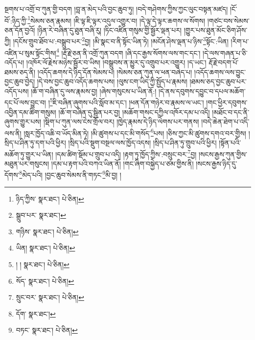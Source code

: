 སྔགས་པ་འགྲོ་བ་ཀུན་གྱི་བདག །བླ་ན་མེད་པའི་བྱང་ཆུབ་ཏུ། །བདེ་གཤེགས་ཀྱིས་ཀྱང་ལུང་བསྟན་མཛད། །ངོ་བོ་:ཉིད་ཀྱི་\footnote{ཉིད་ཀྱིས་  སྣར་ཐང་།  པེ་ཅིན། }སེམས་ཅན་རྣམས། །ཇི་ལྟ་ཇི་ལྟར་འདུལ་འགྱུར་བ། །དེ་ལྟ་དེ་ལྟར་ཆགས་ལ་སོགས། །གཙང་བས་སེམས་ཅན་དོན་བྱའོ། །ཉིན་རེ་བཞིན་དུ་ཐུན་བཞི་རུ། །ཏིང་འཛིན་གསུམ་གྱི་སྦྱོར་ལྡན་པར། །གྱུར་པས་ཐུན་མོང་ཅིག་ཤོས་ཀྱི། །དངོས་གྲུབ་ཐོབ་པ་:བསྒྲུབ་པར་\footnote{སྒྲུབ་པར་  སྣར་ཐང་། }བྱ། །མི་སྣང་བ་ནི་སྟོང་ཡིན་ཏེ། །མངོན་ཤེས་ལྡན་པ་ཉིས་\footnote{གཉིས་  སྣར་ཐང་།  པེ་ཅིན། }སྟོང་:ཡིན། །རིག་པ་འཛིན་པ་སུམ་སྟོང་གིས།\footnote{ཡིན།  སྣར་ཐང་།  པེ་ཅིན། } །རྡོ་རྗེ་ཅན་ནི་འགྲོ་ཀུན་བདག །ཞི་དང་རྒྱས་སོགས་ལས་གང་དང་། །དེ་ལས་གཞན་པ་ཅི་འདོད་པ། །འཁོར་ལོ་རྗེས་མཉེས་སྦྱོར་བ་ཡིས། །བསྒྲུབས་ན་མྱུར་དུ་འགྲུབ་པར་འགྱུར། །ད་ཡང་། རྡོ་རྗེ་བདག་པོ་ཐམས་ཅད་ནི། །འདོད་ཆགས་དེ་ཉིད་དོན་སེམས་པ། །སེམས་ཅན་ཀུན་ལ་ཕན་བཞེད་པ། །འདོད་ཆགས་ལས་བྱུང་བྱང་ཆུབ་བྱེད། །དེ་བས་བྱང་ཆུབ་འདོད་ཆགས་པས། །ལུས་ངག་ཡིད་ཀྱི་སྤྱོད་པ་རྣམས། །ཐམས་ཅད་བྱང་ཆུབ་པར་འདོད་པས། །ཆོ་ག་བཞིན་དུ་ལས་རྣམས་བྱ། །ཞེས་གསུངས་པ་ཡིན་ནོ:། །དེ་ནས་དབུགས་དབྱུང་བ་དཔལ་མཆོག་དང་པོ་ལས་བྱུང་བ། །\footnote{། །  སྣར་ཐང་།  པེ་ཅིན། }ཇི་བཞིན་ཞུགས་པའི་སློབ་མ་དང་། །ཕན་དོན་གཉེར་བ་རྣམས་ལ་ཡང་། །གང་ཕྱིར་དབུགས་འབྱིན་དམ་ཚིག་གསུམ། །ཆོ་ག་བཞིན་དུ་སྦྱིན་པར་བྱ། །མཆོག་གསང་དཀྱིལ་འཁོར་དམ་པ་འདི། །མཐོང་བ་དང་ནི་ཞུགས་གྱུར་པས། །སྡིག་པ་ཀུན་ལས་ངེས་གྲོལ་བར། །ཁྱེད་རྣམས་དེ་ཉིད་ལེགས་པར་གནས། །བདེ་ཆེན་ཐེག་པ་འདི་ལས་ནི། །སླར་ཁྱོད་འཆི་བ་ཡོད་མིན་ཏེ། །མི་ཚུགས་པ་དང་མི་གསོད་\footnote{སོད་  སྣར་ཐང་།  པེ་ཅིན། }པས། །ཅིས་ཀྱང་མི་ཚུགས་དགའ་བར་གྱིས། །སྲིད་པ་ཤིན་ཏུ་དག་པའི་ཕྱིར། །སྲིད་པའི་སྡུག་བསྔལ་ལས་ཁྱོད་འདས། །སྲིད་པ་ཤིན་ཏུ་གྲུབ་པའི་ཕྱིར། །སྟོན་པའི་མཆོག་ཏུ་གྱུར་པ་ཡིན། །དམ་ཚིག་སྡོམ་པ་གྲུབ་པ་འདི། །རྟག་ཏུ་ཁྱོད་ཀྱིས་:བསྲུང་བར་\footnote{སྲུང་བར་  སྣར་ཐང་།  པེ་ཅིན། }བྱ། །སངས་རྒྱས་ཀུན་གྱིས་མཐུན་པར་གསུངས། །དམ་པ་རྟག་པའི་བཀའ་ཡིན་ནོ། །གང་ཞིག་བསྐྱེད་པ་ཙམ་གྱིས་ནི། །སངས་རྒྱས་ཉིད་དུ་དོགས་\footnote{དོག་  སྣར་ཐང་། }མེད་པའི། །བྱང་ཆུབ་སེམས་ནི་གཏང་\footnote{བཏང་  སྣར་ཐང་།  པེ་ཅིན། }མི་བྱ། །
